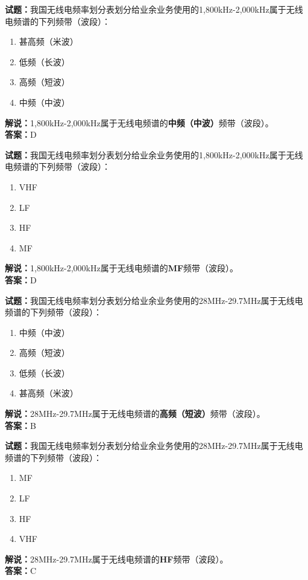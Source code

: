 \documentclass{ctexbook}
\begin{document}
\bigskip




\noindent\textbf{试题：}我国无线电频率划分表划分给业余业务使用的1,800\unit{\kHz}-2,000\unit{\kHz}属于无线电频谱的下列频带（波段）：
\begin{enumerate}[leftmargin=3em]
\item 甚高频（米波）
\item 低频（长波）
\item 高频（短波）
\item 中频（中波）
\end{enumerate}
\noindent\textbf{解说：}1,800\unit{\kHz}-2,000\unit{\kHz}属于无线电频谱的\textbf{中频（中波）}频带（波段）。\\\noindent\textbf{答案：}D

\bigskip




\noindent\textbf{试题：}我国无线电频率划分表划分给业余业务使用的1,800\unit{\kHz}-2,000\unit{\kHz}属于无线电频谱的下列频带（波段）：
\begin{enumerate}[leftmargin=3em]
\item VHF
\item LF
\item HF
\item MF
\end{enumerate}
\noindent\textbf{解说：}1,800\unit{\kHz}-2,000\unit{\kHz}属于无线电频谱的\textbf{MF}频带（波段）。\\\noindent\textbf{答案：}D

\bigskip




\noindent\textbf{试题：}我国无线电频率划分表划分给业余业务使用的28\unit{\MHz}-29.7\unit{\MHz}属于无线电频谱的下列频带（波段）：
\begin{enumerate}[leftmargin=3em]
\item 中频（中波）
\item 高频（短波）
\item 低频（长波）
\item 甚高频（米波）
\end{enumerate}
\noindent\textbf{解说：}28\unit{\MHz}-29.7\unit{\MHz}属于无线电频谱的\textbf{高频（短波）}频带（波段）。\\\noindent\textbf{答案：}B

\bigskip




\noindent\textbf{试题：}我国无线电频率划分表划分给业余业务使用的28\unit{\MHz}-29.7\unit{\MHz}属于无线电频谱的下列频带（波段）：
\begin{enumerate}[leftmargin=3em]
\item MF
\item LF
\item HF
\item VHF
\end{enumerate}
\noindent\textbf{解说：}28\unit{\MHz}-29.7\unit{\MHz}属于无线电频谱的\textbf{HF}频带（波段）。\\\noindent\textbf{答案：}C
\end{document}
